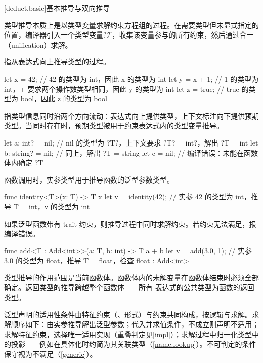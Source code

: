 [deduct.basic]{基本推导与双向推导}

\pnum
类型推导本质上是以类型变量求解约束方程组的过程。在需要类型但未显式指定的位置，编译器引入一个类型变量$\mathcal{?T}$，收集该变量参与的所有约束，然后通过合一（unification）求解。

\pnum
{}指从表达式向上推导类型的过程。\enterexample
\begin{codeblock}
let x = 42;         // 42 的类型为 int，因此 x 的类型为 int
let y = x + 1;      // 1 的类型为 int，+ 要求两个操作数类型相同，因此 y 的类型为 int
let z = true;       // true 的类型为 bool，因此 z 的类型为 bool
\end{codeblock}
\exitexample

\pnum
{}指类型信息同时沿两个方向流动：表达式向上提供类型，上下文标注向下提供预期类型。当同时存在时，预期类型被用于约束表达式内的类型变量推导。\enterexample
\begin{codeblock}
let a: int? = nil;           // nil 的类型为 ?T?，上下文要求 ?T? = int?，解出 ?T = int
let b: string? = nil;        // 同上，解出 ?T = string
let c = nil;                 // 编译错误：未能在函数体内确定 ?T
\end{codeblock}
\exitexample

\pnum
函数调用时，实参类型用于推导函数的泛型参数类型。\enterexample
\begin{codeblock}
func identity<T>(x: T) -> T { x }
let v = identity(42);        // 实参 42 的类型为 int，推导 T = int，v 的类型为 int
\end{codeblock}
\exitexample

\pnum
如果泛型函数带有 trait 约束，则推导过程中同时求解约束。若约束无法满足，报编译错误。\enterexample
\begin{codeblock}
func add<T : Add<int>>(a: T, b: int) -> T { a + b }
let v = add(3.0, 1);         // 实参 3.0 的类型为 float，推导 T = float，检查 float : Add<int>
\end{codeblock}
\exitexample

\pnum
类型推导的作用范围是当前函数体。函数体内的未解变量在函数体结束时必须全部确定。返回类型的推导跨越整个函数体——所有  表达式的公共类型为函数的返回类型。

\pnum
泛型声明的适用性条件由特征约束（\tcode{:}、形式）与约束共同构成，按逻辑与求解。求解顺序如下：由实参推导解出泛型参数；代入并求值条件，不成立则声明不适用；求解特征约束，选择唯一适用实现（重叠判定见\ref{impl}）；求解过程中归一化类型中的投影——例如在具体化时约简为其关联类型（\ref{name.lookup}）。不可判定的条件保守视为不满足（\ref{generic}）。